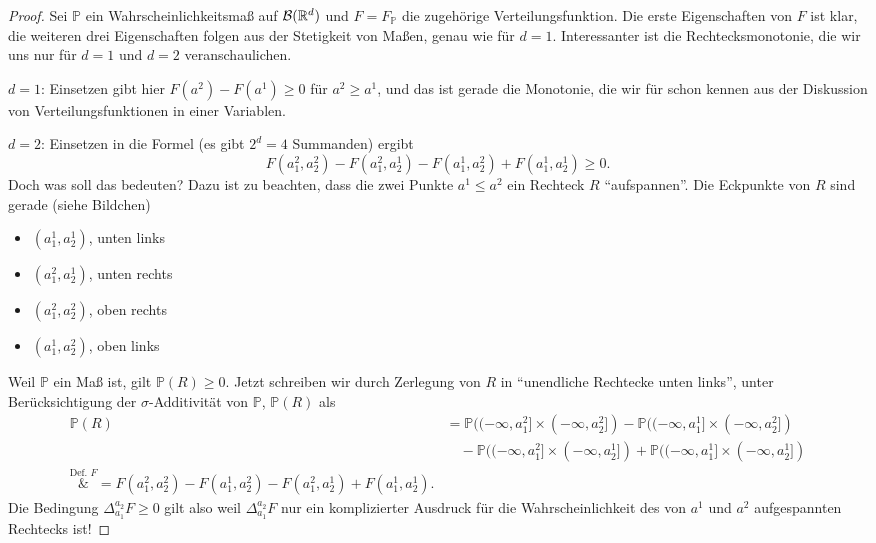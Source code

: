 \begin{proof}
	Sei $\mathbb P$ ein Wahrscheinlichkeitsma\ss{} auf $\mathcal B(\mathbb{R}^d)$ und $F=F_{\mathbb P}$ die zugeh\"orige Verteilungsfunktion. Die erste Eigenschaften von $F$ ist klar, die weiteren drei Eigenschaften folgen aus der Stetigkeit von Maßen, genau wie f\"ur $d=1$. Interessanter ist die Rechtecksmonotonie, die wir uns nur f\"ur $d=1$ und $d=2$ veranschaulichen. \smallskip
	
	$d = 1$: Einsetzen gibt hier $F(a^2) - F(a^1) \geq 0$ f\"ur $a^2\geq a^1$, und das ist gerade die Monotonie, die wir f\"ur schon kennen aus der Diskussion von Verteilungsfunktionen in einer Variablen.\smallskip
	
	$d = 2$: Einsetzen in die Formel (es gibt $2^d=4$ Summanden) ergibt $$F(a_1^2,a_2^2) - F(a_1^2,a_2^1) - F(a_1^1,a_2^2) +  F(a_1^1,a_2^1) \geq 0.$$ Doch was soll das bedeuten? Dazu ist zu beachten, dass die zwei Punkte $a^1\leq a^2$ ein Rechteck $R$ \enquote{aufspannen}. Die Eckpunkte von $R$ sind gerade (siehe Bildchen)
	\begin{itemize}
	\item $(a_1^1,a_2^1)$, unten links
	\item $(a_1^2,a_2^1)$, unten rechts
	\item $(a_1^2,a_2^2)$, oben rechts
	\item $(a^1_1,a_2^2)$, oben links
\end{itemize}	
	 Weil $\mathbb P$ ein Ma\ss{} ist, gilt $\mathbb P(R)\geq 0$. Jetzt schreiben wir durch Zerlegung von $R$ in \enquote{unendliche Rechtecke unten links}, unter Ber\"ucksichtigung der $\sigma$-Additivit\"at von $\mathbb P$, $\mathbb P(R)$ als 
	\begin{align*}
		\mathbb P(R)&=\mathbb P((-\infty,a_1^2]\times (-\infty, a_2^2])-\mathbb P((-\infty,a_1^1]\times (-\infty, a_2^2])\\
		&\quad-\mathbb P((-\infty,a_1^2]\times (-\infty, a_2^1])+\mathbb P((-\infty,a_1^1]\times (-\infty, a_2^1])\\
		\overset{\text{Def. }F}&{=}F(a_1^2,a_2^2)  - F(a_1^1,a_2^2) - F(a_1^2,a_2^1)+  F(a_1^1,a_2^1).
	\end{align*}
	Die Bedingung $\Delta_{a_1}^{a_2}F\geq 0$ gilt also weil $\Delta_{a_1}^{a_2}F$ nur ein komplizierter Ausdruck f\"ur die Wahrscheinlichkeit des von $a^1$ und $a^2$ aufgespannten Rechtecks ist!	
\end{proof}

